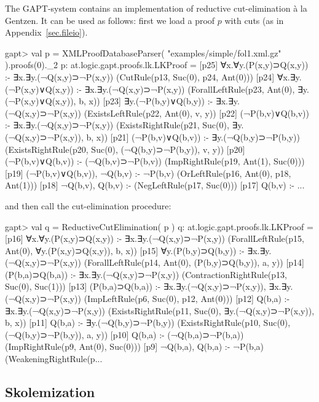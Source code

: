 \documentclass[a4paper,11pt]{article}
\begin{document}
The GAPT-system contains an implementation of reductive cut-elimination
\`{a} la Gentzen. It can be used as follows: first we load a proof $p$
with cuts (as in Appendix~\ref{sec.fileio}).
%
\begin{clilisting}
gapt> val p = XMLProofDatabaseParser( "examples/simple/fol1.xml.gz" ).proofs(0)._2
p: at.logic.gapt.proofs.lk.LKProof =
[p25] ∀x.∀y.(P(x,y)⊃Q(x,y)) :- ∃x.∃y.(¬Q(x,y)⊃¬P(x,y))    (CutRule(p13, Suc(0), p24, Ant(0)))
[p24] ∀x.∃y.(¬P(x,y)∨Q(x,y)) :- ∃x.∃y.(¬Q(x,y)⊃¬P(x,y))    (ForallLeftRule(p23, Ant(0), ∃y.(¬P(x,y)∨Q(x,y)), b, x))
[p23] ∃y.(¬P(b,y)∨Q(b,y)) :- ∃x.∃y.(¬Q(x,y)⊃¬P(x,y))    (ExistsLeftRule(p22, Ant(0), v, y))
[p22] (¬P(b,v)∨Q(b,v)) :- ∃x.∃y.(¬Q(x,y)⊃¬P(x,y))    (ExistsRightRule(p21, Suc(0), ∃y.(¬Q(x,y)⊃¬P(x,y)), b, x))
[p21] (¬P(b,v)∨Q(b,v)) :- ∃y.(¬Q(b,y)⊃¬P(b,y))    (ExistsRightRule(p20, Suc(0), (¬Q(b,y)⊃¬P(b,y)), v, y))
[p20] (¬P(b,v)∨Q(b,v)) :- (¬Q(b,v)⊃¬P(b,v))    (ImpRightRule(p19, Ant(1), Suc(0)))
[p19] (¬P(b,v)∨Q(b,v)), ¬Q(b,v) :- ¬P(b,v)    (OrLeftRule(p16, Ant(0), p18, Ant(1)))
[p18] ¬Q(b,v), Q(b,v) :-     (NegLeftRule(p17, Suc(0)))
[p17] Q(b,v) :- ...
\end{clilisting}
%
and then call the cut-elimination procedure:
\begin{clilisting}
gapt> val q = ReductiveCutElimination( p )
q: at.logic.gapt.proofs.lk.LKProof =
[p16] ∀x.∀y.(P(x,y)⊃Q(x,y)) :- ∃x.∃y.(¬Q(x,y)⊃¬P(x,y))    (ForallLeftRule(p15, Ant(0), ∀y.(P(x,y)⊃Q(x,y)), b, x))
[p15] ∀y.(P(b,y)⊃Q(b,y)) :- ∃x.∃y.(¬Q(x,y)⊃¬P(x,y))    (ForallLeftRule(p14, Ant(0), (P(b,y)⊃Q(b,y)), a, y))
[p14] (P(b,a)⊃Q(b,a)) :- ∃x.∃y.(¬Q(x,y)⊃¬P(x,y))    (ContractionRightRule(p13, Suc(0), Suc(1)))
[p13] (P(b,a)⊃Q(b,a)) :- ∃x.∃y.(¬Q(x,y)⊃¬P(x,y)), ∃x.∃y.(¬Q(x,y)⊃¬P(x,y))    (ImpLeftRule(p6, Suc(0), p12, Ant(0)))
[p12] Q(b,a) :- ∃x.∃y.(¬Q(x,y)⊃¬P(x,y))    (ExistsRightRule(p11, Suc(0), ∃y.(¬Q(x,y)⊃¬P(x,y)), b, x))
[p11] Q(b,a) :- ∃y.(¬Q(b,y)⊃¬P(b,y))    (ExistsRightRule(p10, Suc(0), (¬Q(b,y)⊃¬P(b,y)), a, y))
[p10] Q(b,a) :- (¬Q(b,a)⊃¬P(b,a))    (ImpRightRule(p9, Ant(0), Suc(0)))
[p9] ¬Q(b,a), Q(b,a) :- ¬P(b,a)    (WeakeningRightRule(p...
\end{clilisting}


\subsection{Skolemization}
\end{document}
